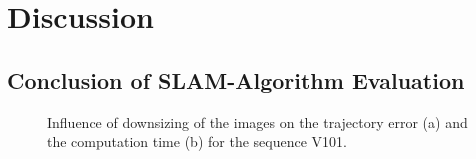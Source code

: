 \section{Discussion}

\subsection{Conclusion of SLAM-Algorithm Evaluation}

% 


	\begin{figure}%
    \centering
	\qquad
    \caption{
	Influence of downsizing of the images on the trajectory error (a) and the computation time (b) for the sequence V101. 
	}%
    \label{fig:resolution}%
	\end{figure}

